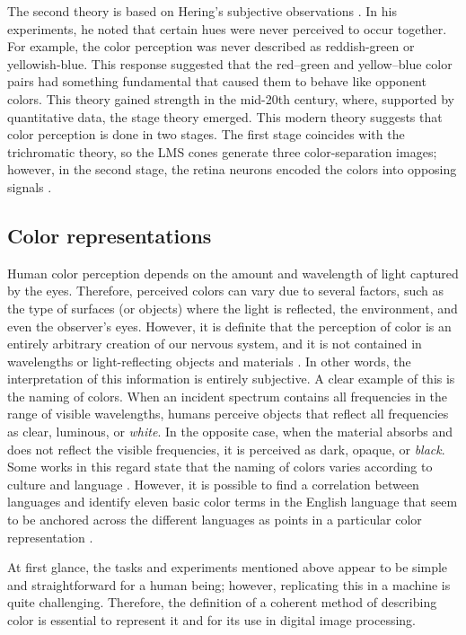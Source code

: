 The second theory is based on Hering's subjective observations \citep{Hering:Book:1878}. In his experiments, he noted that certain hues were never perceived to occur together. For example, the color perception was never described as reddish-green or yellowish-blue. This response suggested that the red–green and yellow–blue color pairs had something fundamental that caused them to behave like opponent colors. 
This theory gained strength in the mid-20th century, where, supported by quantitative data, the stage theory emerged. This modern theory suggests that color perception is done in two stages. The first stage coincides with the trichromatic theory, so the LMS cones generate three color-separation images; however, in the second stage, the retina neurons encoded the colors into opposing signals \citep{Fairchild:Book:2005}. 

\subsection{Color representations}
Human color perception depends on the amount and wavelength of light captured by the eyes. Therefore, perceived colors can vary due to several factors, such as the type of surfaces (or objects) where the light is reflected, the environment, and even the observer's eyes. However, it is definite that the perception of color is an entirely arbitrary creation of our nervous system, and it is not contained in wavelengths or light-reflecting objects and materials \citep{Goldstein:Book:2009}. In other words, the interpretation of this information is entirely subjective. A clear example of this is the naming of colors. When an incident spectrum contains all frequencies in the range of visible wavelengths, humans perceive objects that reflect all frequencies as clear, luminous, or \textit{white}. In the opposite case, when the material absorbs and does not reflect the visible frequencies, it is perceived as dark, opaque, or \textit{black}. Some works in this regard state that the naming of colors varies according to culture and language \citep{Berlin.Kay:Book:1991}. However, it is possible to find a correlation between languages and identify eleven basic color terms in the English language that seem to be anchored across the different languages as points in a particular color representation \citep{Kay.Regier:PNAS:2003}.%

At first glance, the tasks and experiments mentioned above appear to be simple and straightforward for a human being; however, replicating this in a machine is quite challenging. Therefore, the definition of a coherent method of describing color is essential to represent it and for its use in digital image processing.

